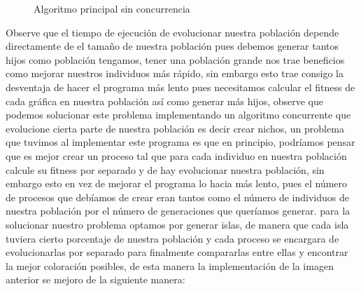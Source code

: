 \documentclass{article}
\begin{document}
\begin{figure}[H]
    \caption{Algoritmo principal sin concurrencia}
\end{figure}
\newpage

Observe que el tiempo de ejecución de evolucionar nuestra población depende directamente de el tamaño de nuestra población pues debemos generar tantos hijos como población tengamos, tener una población grande nos trae beneficios como mejorar nuestros individuos más rápido, sin embargo esto trae consigo la desventaja de hacer el programa más lento pues necesitamos calcular el fitness de cada gráfica en nuestra población así como generar más hijos, observe que podemos solucionar este problema implementando un algoritmo concurrente que evolucione cierta parte de nuestra población es decir crear nichos, un problema que tuvimos al implementar este programa es que en principio, podríamos pensar que es mejor crear un proceso tal que para cada individuo en nuestra población calcule su fitness por separado y de hay evolucionar nuestra población, sin embargo esto en vez de mejorar el programa lo hacia más lento, pues el número de procesos que debíamos de crear eran tantos como el número de individuos de nuestra población por el número de generaciones que queríamos generar.
para la solucionar nuestro problema optamos por generar islas, de manera que cada isla tuviera cierto porcentaje de nuestra población y cada proceso se encargara de evolucionarlas por separado para finalmente compararlas entre ellas y encontrar la mejor coloración posibles, de esta manera la implementación de la imagen anterior se mejoro de la siguiente manera:
\end{document}
